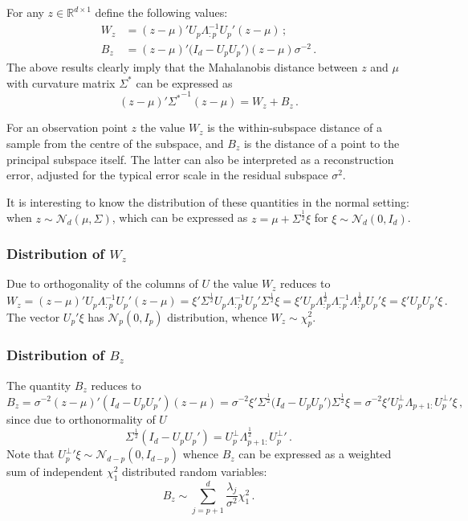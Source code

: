 \documentclass[a4paper,14pt]{article}
\begin{document}
For any $z\in \mathbb{R}^{d\times 1}$ define the following values:
\begin{align*}
    W_z &= (z-\mu)' U_p\Lambda_{:p}^{-1} U_p' (z-\mu)\,;\\
    B_z &= (z-\mu)' \bigl( I_d - U_p U_p'\bigr) (z-\mu) \sigma^{-2}\,.
\end{align*}
The above results clearly imply that the Mahalanobis distance between $z$ and $\mu$
with curvature matrix $\Sigma^*$ can be expressed as
$$ (z-\mu)'{\Sigma^*}^{-1}(z-\mu) = W_z + B_z \,.$$

For an observation point $z$ the value $W_z$ is the within-subspace distance of
a sample from the centre of the subspace, and $B_z$ is the distance of a point to
the principal subspace itself. The latter can also be interpreted as a reconstruction
error, adjusted for the typical error scale in the residual subspace $\sigma^2$.

It is interesting to know the distribution of these quantities in the normal setting:
when $z\sim\mathcal{N}_d(\mu, \Sigma)$, which can be expressed as $z = \mu + \Sigma^\frac{1}{2} \xi$
for $\xi\sim\mathcal{N}_d(0, I_d)$.


\subsubsection{Distribution of $W_z$} %
\label{ssub:distribution_of_w_z}

Due to orthogonality of the columns of $U$ the value $W_z$ reduces to
$$W_z
    = (z-\mu)'U_p\Lambda_{:p}^{-1}U_p'(z-\mu)
    = \xi' \Sigma^\frac{1}{2} U_p\Lambda_{:p}^{-1}U_p' \Sigma^\frac{1}{2} \xi
    = \xi' U_p \Lambda_{:p}^\frac{1}{2}\Lambda_{:p}^{-1}\Lambda_{:p}^\frac{1}{2} U_p' \xi
    = \xi' U_p U_p' \xi
    \,.$$
The vector $U_p' \xi$ has $\mathcal{N}_p(0, I_p)$ distribution, whence $W_z \sim \chi^2_p$.


\subsubsection{Distribution of $B_z$} %
\label{ssub:distribution_of_b_z}

The quantity $B_z$ reduces to
$$B_z
    = \sigma^{-2} (z-\mu)' (I_d - U_p  U_p') (z-\mu)
    = \sigma^{-2} \xi' \Sigma^\frac{1}{2} \bigl(I_d - U_p  U_p'\bigr) \Sigma^\frac{1}{2} \xi
    = \sigma^{-2} \xi' U_p^\perp \Lambda_{p+1:} {U_p^\perp}' \xi\,,$$
since due to orthonormality of $U$
$$\Sigma^\frac{1}{2} (I_d - U_p  U_p')
    = U_p^\perp \Lambda_{p+1:}^\frac{1}{2} {U_p^\perp}'
    \,.$$
Note that ${U_p^\perp}' \xi \sim \mathcal{N}_{d-p}(0, I_{d-p})$ whence $B_z$ can be expressed
as a weighted sum of independent $\chi^2_1$ distributed random variables:
$$B_z \sim \sum_{j=p+1}^d \frac{\lambda_j}{\sigma^2} \chi^2_1\,.$$
\end{document}
